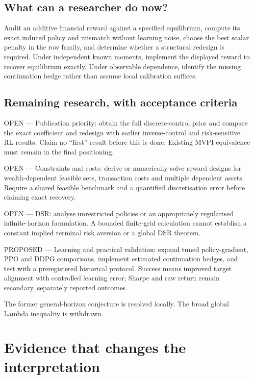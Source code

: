 \documentclass[11pt,a4paper]{article}
\theoremstyle{plain}
\theoremstyle{definition}
\begin{document}
\subsection{What can a researcher do now?}
Audit an additive financial reward against a specified equilibrium, compute its exact induced policy and mismatch without learning noise, choose the best scalar penalty in the raw family, and determine whether a structural redesign is required. Under independent known moments, implement the displayed reward to recover equilibrium exactly. Under observable dependence, identify the missing continuation hedge rather than assume local calibration suffices.

\subsection{Remaining research, with acceptance criteria}
OPEN --- Publication priority: obtain the full discrete-control prior and compare the exact coefficient and redesign with earlier inverse-control and risk-sensitive RL results. Claim no ``first'' result before this is done. Existing MVPI equivalence must remain in the final positioning.

OPEN --- Constraints and costs: derive or numerically solve reward designs for wealth-dependent feasible sets, transaction costs and multiple dependent assets. Require a shared feasible benchmark and a quantified discretisation error before claiming exact recovery.

OPEN --- DSR: analyse unrestricted policies or an appropriately regularised infinite-horizon formulation. A bounded finite-grid calculation cannot establish a constant implied terminal risk aversion or a global DSR theorem.

PROPOSED --- Learning and practical validation: expand tuned policy-gradient, PPO and DDPG comparisons, implement estimated continuation hedges, and test with a preregistered historical protocol. Success means improved target alignment with controlled learning error; Sharpe and raw return remain secondary, separately reported outcomes.

The former general-horizon conjecture is resolved locally. The broad global Lambda inequality is withdrawn.


\clearpage

\section{Evidence that changes the interpretation}
\end{document}
